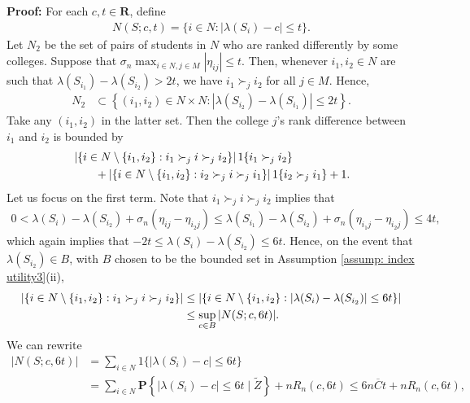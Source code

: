\documentclass[12pt, fullpage]{amsart}
\theoremstyle{definition}
\theoremstyle{definition}
\theoremstyle{definition}
\begin{document}
\begin{bibunit}[econometrica]
\noindent \textbf{Proof: } For each $c,t \in \mathbf{R}$, define
\begin{align*}
	N(S;c,t) = \{i \in N: |\lambda(S_i) - c| \le t \}.
\end{align*}
Let $N_2$ be the set of pairs of students in $N$ who are ranked differently
by some colleges. Suppose that $\sigma_n \max_{i \in N,j \in M} |\eta_{ij}| \le t$. Then, whenever $i_1,i_2 \in N$ are such that $\lambda(S_{i_1}) - \lambda(S_{i_2}) > 2 t$, we have $i_1 \succ_j i_2$ for all $j \in M$. Hence,
\begin{align}
	N_2 & \subset \left\{(i_{1},i_{2}) \in N \times N : \left| \lambda(S_{i_2})-\lambda(S_{i_1}) \right| \leq 2 t \right\}.\label{eq:subset_rho}
\end{align}
Take any $(i_1,i_2)$ in the latter set. Then the college $j$'s rank difference between $i_1$ and $i_2$ is bounded by
\begin{align}
	\label{ineq3}
	&\left| \left\{i \in N \setminus \{i_1,i_2\}: i_1 \succ_j i \succ_j i_2\right\} \right| 1\{ i_1 \succ_j i_2\} \\ \notag
	&\qquad + \left| \left\{i \in N \setminus \{i_1,i_2\}: i_2 \succ_j i \succ_j i_1 \right\} \right| 1\{i_2 \succ_j i_1\}+1.
\end{align}
Let us focus on the first term. Note that $i_1 \succ_j i \succ_j i_2$ implies that
\begin{align*}
     0 < \lambda(S_i) - \lambda(S_{i_2}) + \sigma_n (\eta_{ij} - \eta_{i_2 j} ) \le \lambda(S_{i_1}) - \lambda(S_{i_2}) + \sigma_n (\eta_{i_1 j} - \eta_{i_2 j} ) \le 4 t,
\end{align*}
which again implies that $-2 t \le \lambda(S_{i}) - \lambda(S_{i_2})  \le 6 t.$ Hence, on the event that $\lambda(S_{i_2}) \in B$, with $B$ chosen to be the bounded set in Assumption \ref{assump: index utility3}(ii),
\begin{align}
	\label{ineq31}
	\left| \left\{i \in N \setminus \{i_1,i_2\}: i_1 \succ_j i \succ_j i_2 \right\}\right| &\le \left| \left\{i \in N \setminus \{i_1,i_2\}: \left| \lambda(S_{i}) - \lambda(S_{i_2})  \right| \le 6 t \right\}\right|\\ \notag
	&\le \sup_{c \in B} | N(S;c,6 t) |.
\end{align}
We can rewrite
\begin{align*}
	| N(S;c,6 t) | &= \sum_{i \in N} 1\{|\lambda(S_i) - c| \le 6 t\}\\
	 &= \sum_{i \in N} \mathbf{P}\left\{|\lambda(S_i) - c | \le 6 t \mid \tilde Z \right\} + n R_n(c, 6 t) \le 6 n \overline C t + n R_n(c, 6 t),

\end{align*}
\end{bibunit}
\end{document}
